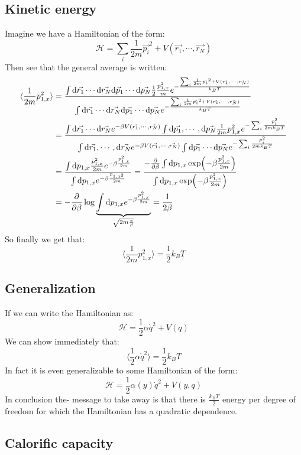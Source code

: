 \documentclass[10pt,a4paper]{book}
\begin{document}
\subsection{Kinetic energy}
Imagine we have a Hamiltonian of the form:
\[
\mathcal{H} = \sum_i \frac{1}{2m} \vec{p_i}^2 + V( \vec{r_1}, \cdots, \vec{r_N})
\]
Then see that the general average is written:
\begin{align*}
\langle \frac{1}{2 m} p_{1,x}^2 \rangle &= \frac{\int \dd \vec{r_1} \cdots \dd \vec{r_N} \dd \vec{p}_1 \cdots \dd\vec{p_N} \frac{1}{2} \frac{p_{1,x}^2}{m} e^{-\frac{\sum_i \frac{1}{2m} \vec{p_i}^2 + V(\vec{r_1}, \cdots, \vec{r_N})}{k_B T}}}{\int \dd \vec{r_1} \cdots \dd \vec{r_N} \dd \vec{p_1} \cdots \dd \vec{p_N} e^{-\frac{\sum_i \frac{1}{2m} \vec{p_i}^2 + V(\vec{r_1}, \cdots, \vec{r_N})}{k_B T}}} \\
&= \frac{\int \dd \vec{r_1} \cdots
 \dd \vec{r_N} e^{-\beta V(\vec{r_1}, \cdots,  \vec{r_N})} \int \dd \vec{p_1}, \cdots, \dd\vec{p_N} \frac{1}{2m} p_{1,x}^2 e^{-\sum_i \frac{p_i^2}{2 m k_B T}}}{\int \dd \vec{r_1}, \cdots, \dd \vec{r_N} e^{-\beta V(\vec{r_1}, \cdots, \vec{r_N})} \int \dd \vec{p_1} \cdots \dd \vec{p_N} e^{-\sum_i \frac{p_i^2}{2m k_B T}}} \\
 &= \frac{\int \dd p_{1,x} \frac{p_{1, x}^2}{2m} e^{-\beta \frac{p_{1,x}^2}{2m}}}{\int \dd p_{1,x} e^{-\beta\frac{p_{1,x^2}}{2m}}} = \frac{-\pdv{}{\beta}\int \dd p_{1,x} \exp(-\beta \frac{p_{1, x}^2}{2m})}{\int \dd p_{1,x} \exp(-\beta \frac{p_{1, x}^2}{2m})}\\
&= -\pdv{}{\beta} \log \underbrace{\int \dd p_{1,x} e^{-\beta \frac{p_{1,x}^2}{2m}}}_{\sqrt{2m\frac{\pi}{\beta}}} = \frac{1}{2\beta}
\end{align*}
So finally we get that:
\[
\langle \frac{1}{2 m} p_{1,x}^2  \rangle = \frac{1}{2} k_B T
\]
\subsection{Generalization}
If we can write the Hamiltonian as:
\[
\mathcal{H} = \frac{1}{2}\alpha \dot{q}^2 + V( q)
\]
We can show immediately that:
\[
\langle \frac{1}{2}\alpha \dot{q}^2\rangle = \frac{1}{2} k_B T
\]
In fact it is even generalizable to some Hamiltonian of the form:
\[
\mathcal{H} = \frac{1}{2} \alpha(y) \dot{q}^2 + V(y, q)
\]
In conclusion the- message to take away is that there is $\frac{k_B T}{2}$ energy per degree of freedom for which the Hamiltonian has a quadratic dependence.

\subsection{Calorific capacity}
\end{document}
